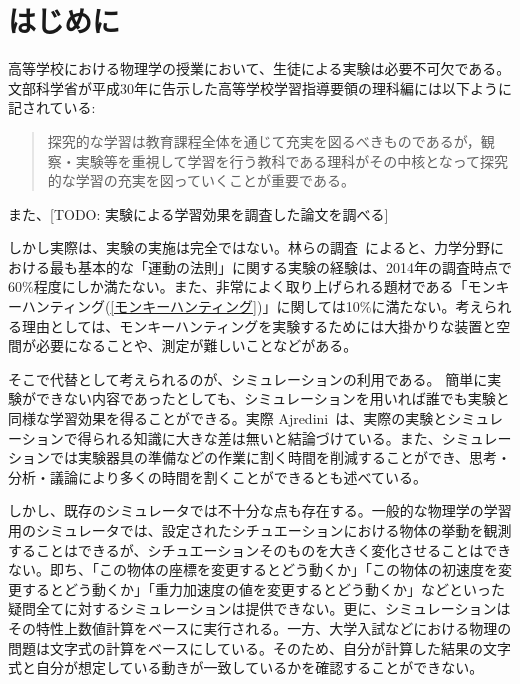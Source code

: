 \chapter{はじめに} \label{first}

高等学校における物理学の授業において、生徒による実験は必要不可欠である。文部科学省が平成30年に告示した高等学校学習指導要領の理科編には以下ように記されている:
\begin{quote}
探究的な学習は教育課程全体を通じて充実を図るべきものであるが，観察・実験等を重視して学習を行う教科である理科がその中核となって探究的な学習の充実を図っていくことが重要である。
\end{quote}
また、[TODO: 実験による学習効果を調査した論文を調べる]

しかし実際は、実験の実施は完全ではない。林らの調査~\cite{2015KJ00010038066}によると、力学分野における最も基本的な「運動の法則」に関する実験の経験は、2014年の調査時点で60\%程度にしか満たない。また、非常によく取り上げられる題材である「モンキーハンティング(\ref{モンキーハンティング})」に関しては10\%に満たない。考えられる理由としては、モンキーハンティングを実験するためには大掛かりな装置と空間が必要になることや、測定が難しいことなどがある。

そこで代替として考えられるのが、シミュレーションの利用である。
簡単に実験ができない内容であったとしても、シミュレーションを用いれば誰でも実験と同様な学習効果を得ることができる。実際 Ajredini~\cite{ajredini_real_2014}は、実際の実験とシミュレーションで得られる知識に大きな差は無いと結論づけている。また、シミュレーションでは実験器具の準備などの作業に割く時間を削減することができ、思考・分析・議論により多くの時間を割くことができるとも述べている。

しかし、既存のシミュレータでは不十分な点も存在する。一般的な物理学の学習用のシミュレータでは、設定されたシチュエーションにおける物体の挙動を観測することはできるが、シチュエーションそのものを大きく変化させることはできない。即ち、「この物体の座標を変更するとどう動くか」「この物体の初速度を変更するとどう動くか」「重力加速度の値を変更するとどう動くか」などといった疑問全てに対するシミュレーションは提供できない。更に、シミュレーションはその特性上数値計算をベースに実行される。一方、大学入試などにおける物理の問題は文字式の計算をベースにしている。そのため、自分が計算した結果の文字式と自分が想定している動きが一致しているかを確認することができない。

